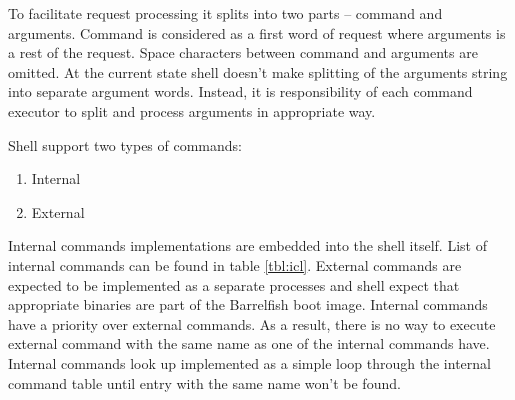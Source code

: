 \documentclass[a4paper,10pt]{article}
\begin{document}
	To facilitate request processing it splits into two parts -- command and arguments.
	Command is considered as a first word of request where arguments is a rest of the request.
	Space characters between command and arguments are omitted.
	At the current state shell doesn't make splitting of the arguments string into separate argument words.
	Instead, it is responsibility of each command executor to split and process arguments in appropriate way. 
	
	  Shell support two types of commands:
	  \begin{enumerate}
	  	\item Internal
	  	\item External
	  \end{enumerate}  
	  Internal commands implementations are embedded into the shell itself. List of internal commands can be found in table \ref{tbl:icl}.
	  External commands are expected to be implemented as a separate processes and shell expect that appropriate binaries are part of the Barrelfish boot image.
	  Internal commands have a priority over external commands.
	  As a result, there is no way to execute external command with the same name as one of the internal commands have.
	  Internal commands look up implemented as a simple loop through the internal command table until entry with the same name won't be found. 
	  
\end{document}
